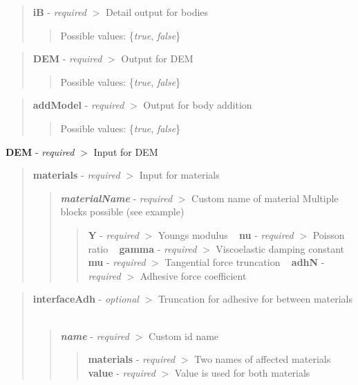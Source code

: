 \begin{quote}
{\bfseries{iB}} -\/ {\itshape required} $>$ Detail output for bodies \begin{quote}
Possible values\+: \{{\itshape true}, {\itshape false}\} \end{quote}
\end{quote}


\begin{quote}
{\bfseries{D\+EM}} -\/ {\itshape required} $>$ Output for D\+EM \begin{quote}
Possible values\+: \{{\itshape true}, {\itshape false}\} \end{quote}
\end{quote}


\begin{quote}
{\bfseries{add\+Model}} -\/ {\itshape required} $>$ Output for body addition \begin{quote}
Possible values\+: \{{\itshape true}, {\itshape false}\} \end{quote}
\end{quote}


{\bfseries{D\+EM}} -\/ {\itshape required} $>$ Input for D\+EM

\begin{quote}
{\bfseries{materials}} -\/ {\itshape required} $>$ Input for materials ~\newline
 \begin{quote}
{\itshape {\bfseries{material\+Name}}} -\/ {\itshape required} $>$ Custom name of material Multiple blocks possible (see example) \begin{quote}
{\bfseries{Y}} -\/ {\itshape required} $>$ Young\textquotesingle{}s modulus ~\newline
 {\bfseries{nu}} -\/ {\itshape required} $>$ Poisson ratio ~\newline
 {\bfseries{gamma}} -\/ {\itshape required} $>$ Viscoelastic damping constant ~\newline
 {\bfseries{mu}} -\/ {\itshape required} $>$ Tangential force truncation ~\newline
 {\bfseries{adhN}} -\/ {\itshape required} $>$ Adhesive force coefficient \end{quote}
\end{quote}
\end{quote}


\begin{quote}
{\bfseries{interface\+Adh}} -\/ {\itshape optional} $>$ Truncation for adhesive for between materials ~\newline
 \begin{quote}
{\itshape {\bfseries{name}}} -\/ {\itshape required} $>$ Custom id name \begin{quote}
{\bfseries{materials}} -\/ {\itshape required} $>$ Two names of affected materials ~\newline
 {\bfseries{value}} -\/ {\itshape required} $>$ Value is used for both materials \end{quote}
\end{quote}
\end{quote}


